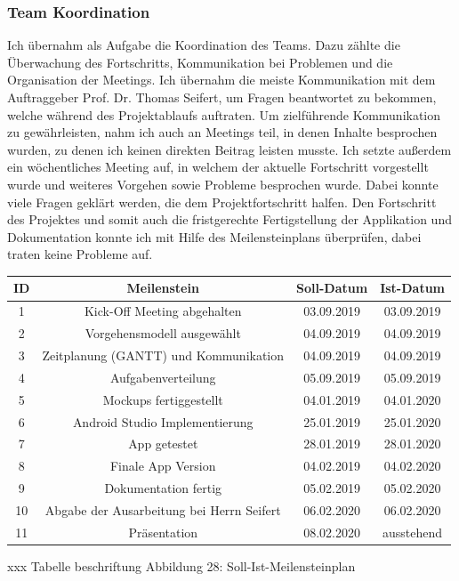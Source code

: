 \subsubsection{Team Koordination}

Ich übernahm als Aufgabe die Koordination des Teams. Dazu zählte die Überwachung des Fortschritts, Kommunikation bei Problemen und die Organisation der Meetings. Ich übernahm die meiste Kommunikation mit dem Auftraggeber Prof. Dr. Thomas Seifert, um Fragen beantwortet zu bekommen, welche während des Projektablaufs auftraten. Um zielführende Kommunikation zu gewährleisten, nahm ich auch an Meetings teil, in denen Inhalte besprochen wurden, zu denen ich keinen direkten Beitrag leisten musste. Ich setzte außerdem ein wöchentliches Meeting auf, in welchem der aktuelle Fortschritt vorgestellt wurde und weiteres Vorgehen sowie Probleme besprochen wurde. Dabei konnte viele Fragen geklärt werden, die dem Projektfortschritt halfen. Den Fortschritt des Projektes und somit auch die fristgerechte Fertigstellung der Applikation und Dokumentation konnte ich mit Hilfe des Meilensteinplans überprüfen, dabei traten keine Probleme auf. 

\begin{tabular}{|c|c|c|c|} 
	\hline
	ID	& Meilenstein &	Soll-Datum & Ist-Datum \\
	\hline	
	1	& Kick-Off Meeting abgehalten & 03.09.2019 & 03.09.2019 \\
	\hline
	2	& Vorgehensmodell ausgewählt & 04.09.2019	& 04.09.2019 \\
	\hline
	3	& Zeitplanung (GANTT) und Kommunikation	& 04.09.2019	& 04.09.2019 \\
	\hline
	4	& Aufgabenverteilung	& 05.09.2019	& 05.09.2019 \\
	\hline
	5	& Mockups fertiggestellt	& 04.01.2019	& 04.01.2020 \\
	\hline
	6	& Android Studio Implementierung	& 25.01.2019	& 25.01.2020 \\
	\hline
	7	& App getestet	& 28.01.2019	& 28.01.2020  \\
	\hline
	8	& Finale App Version	& 04.02.2019	& 04.02.2020 \\
	\hline
	9	& Dokumentation fertig	& 05.02.2019	& 05.02.2020 \\
	\hline
	10	& Abgabe der Ausarbeitung bei Herrn Seifert	& 06.02.2020	& 06.02.2020 \\
	\hline
	11	& Präsentation	& 08.02.2020	& ausstehend \\
	\hline
\end{tabular}
xxx Tabelle beschriftung
Abbildung 28: Soll-Ist-Meilensteinplan


